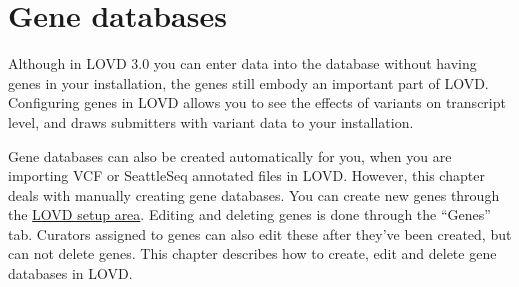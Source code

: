 \documentclass[a4paper,oneside,openany,12pt]{memoir}
\begin{document}
\chapter{Gene databases}
Although in LOVD 3.0 you can enter data into the database without having genes in your installation, the genes still embody an important part of LOVD.
Configuring genes in LOVD allows you to see the effects of variants on transcript level, and draws submitters with variant data to your installation.
\par
Gene databases can also be created automatically for you, when you are importing VCF or SeattleSeq annotated files in LOVD.
However, this chapter deals with manually creating gene databases.
You can create new genes through the \hyperlink{c_setup}{LOVD setup area}.
Editing and deleting genes is done through the ``Genes'' tab.
Curators assigned to genes can also edit these after they've been created, but can not delete genes.
This chapter describes how to create, edit and delete gene databases in LOVD.





\hypertarget{s_gene_create}{}
\end{document}
